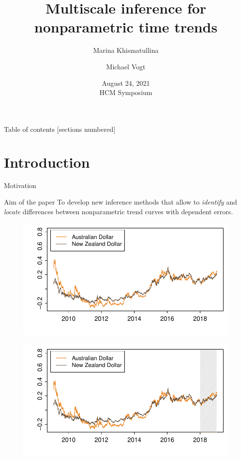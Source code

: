 \documentclass[10pt]{beamer}
\title{Multiscale inference for nonparametric time trends}
\date{August 24, 2021\\ HCM Symposium}
\author{Marina Khismatullina \and Michael Vogt}
\begin{document}
\maketitle

\begin{frame}{Table of contents}
  [sections numbered]
  \tableofcontents[hideallsubsections]
\end{frame}

\section{Introduction}


\begin{frame}{Motivation}

{ \begin{block}{Aim of the paper}
	To develop new inference methods that allow to \textit{identify} and \textit{locate} differences between nonparametric trend curves with dependent errors.
\end{block}}
	{\begin{figure}
    		\centering
    		\includegraphics[height=0.45\textheight]{plots/exchange_rates.pdf}
  	\end{figure}}
	{\onslide<3>
	\vspace{-46,81mm}
	\begin{figure}
    		\centering
    		\includegraphics[height=0.45\textheight]{plots/exchange_rates_1.pdf}

\end{figure}}
\end{frame}
\end{document}
